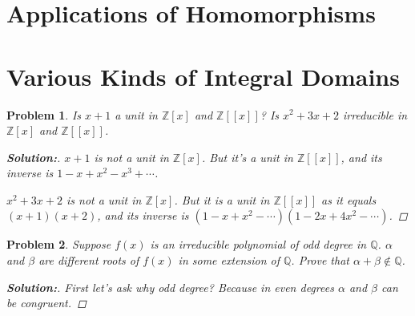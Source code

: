 \documentclass[11pt]{article}
\newcommand{\mz}{\mathbb{Z}}
\newcommand{\mq}{\mathbb{Q}}
\newtheorem{problem}{Problem}
\numberwithin{problem}{section}
\newenvironment{solution}
               {\let\oldqedsymbol=\qedsymbol
                \renewcommand{\qedsymbol}{$\blacktriangleleft$}
                \begin{proof}[\bfseries\upshape Solution:]}
               {\end{proof}
                \renewcommand{\qedsymbol}{\oldqedsymbol}}
\begin{document}
\section{Applications of Homomorphisms}

\section{Various Kinds of Integral Domains}

\begin{problem}
Is $x+1$ a unit in $\mz[x]$ and $\mz[[x]]$? Is $x^2+3x+2$ irreducible in $\mz[x]$ and $\mz[[x]]$.
\begin{solution}
$x+1$ is not a unit in $\mz[x]$. But it's a unit in $\mz[[x]]$, and its inverse is $1-x+x^2-x^3+\cdots$.

$x^2+3x+2$ is not a unit in $\mz[x]$. But it is a unit in $\mz[[x]]$ as it equals $(x+1)(x+2)$, and its inverse is $(1-x+x^2-\cdots)(1-2x+4x^2-\cdots)$.
\end{solution}
\end{problem}

\begin{problem}
Suppose $f(x)$ is an irreducible polynomial of odd degree in $\mq$. $\alpha$ and $\beta$ are different roots of $f(x)$ in some extension of $\mq$. Prove that $\alpha+\beta \notin \mq$.

\begin{solution}
First let's ask why odd degree? Because in even degrees $\alpha$ and $\beta$ can be congruent.
\end{solution}
\end{problem}
\end{document}
